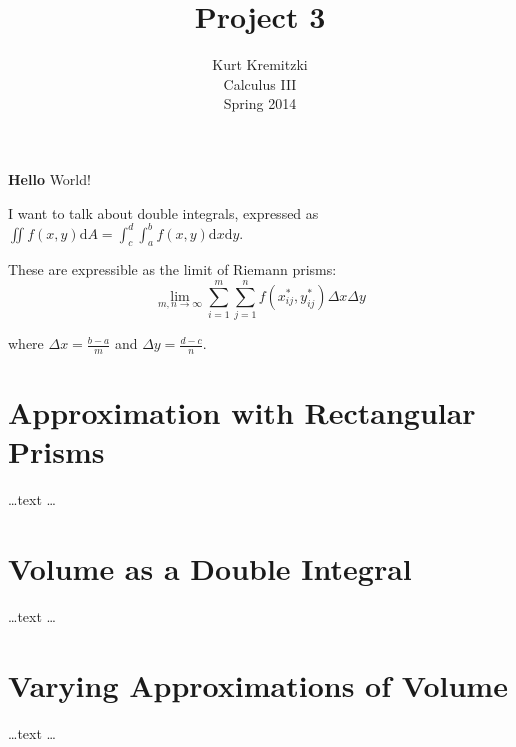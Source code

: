 \documentclass{article}
\begin{document}
\title{Project 3}
\author{Kurt Kremitzki\\
        Calculus III\\
        Spring 2014}
\maketitle

{\bf Hello} World!

I want to talk about double integrals, expressed as $\iint f(x,y)\mathrm{d}A= \int_c^d\int_a^b f(x,y) \mathrm{d}x \mathrm{d}y$.

These are expressible as the limit of Riemann prisms:
\begin{equation}
    \lim_{m,n \to \infty} \sum_{i=1}^{m} \sum_{j=1}^{n} f(x_{ij}^{ *}, y_{ij}^{ *}) \Delta x \Delta y
\end{equation}

where $\Delta x = \frac{b-a}{m}$ and $\Delta y = \frac{d - c}{n}$.

\section{Approximation with Rectangular Prisms}
    \ldots text \ldots

\section{Volume as a Double Integral}
    \ldots text \ldots

\section{Varying Approximations of Volume}
    \ldots text \ldots
\end{document}
